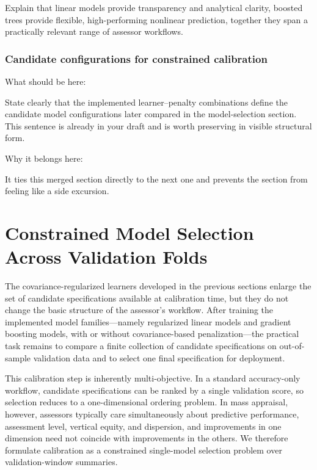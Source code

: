 \documentclass[12pt, draft]{article}
\theoremstyle{plain}
\theoremstyle{definition}
\newcommand{\1}{\mathbf{1}}
\begin{document}
{Explain that linear models provide transparency and analytical clarity,
boosted trees provide flexible, high-performing nonlinear prediction,
together they span a practically relevant range of assessor workflows.

\subsubsection{Candidate configurations for constrained calibration}

What should be here:

State clearly that the implemented learner–penalty combinations define the candidate model configurations later compared in the model-selection section.
This sentence is already in your draft and is worth preserving in visible structural form.

Why it belongs here:

It ties this merged section directly to the next one and prevents the section from feeling like a side excursion.



\section{Constrained Model Selection Across Validation Folds}
\label{sec:model_selection}

The covariance-regularized learners developed in the previous sections enlarge the set of candidate specifications available at calibration time, but they do not change the basic structure of the assessor's workflow. After training the implemented model families---namely regularized linear models and gradient boosting models, with or without covariance-based penalization---the practical task remains to compare a finite collection of candidate specifications on out-of-sample validation data and to select one final specification for deployment.

This calibration step is inherently multi-objective. In a standard accuracy-only workflow, candidate specifications can be ranked by a single validation score, so selection reduces to a one-dimensional ordering problem. In mass appraisal, however, assessors typically care simultaneously about predictive performance, assessment level, vertical equity, and dispersion, and improvements in one dimension need not coincide with improvements in the others. We therefore formulate calibration as a constrained single-model selection problem over validation-window summaries.

}
\end{document}
